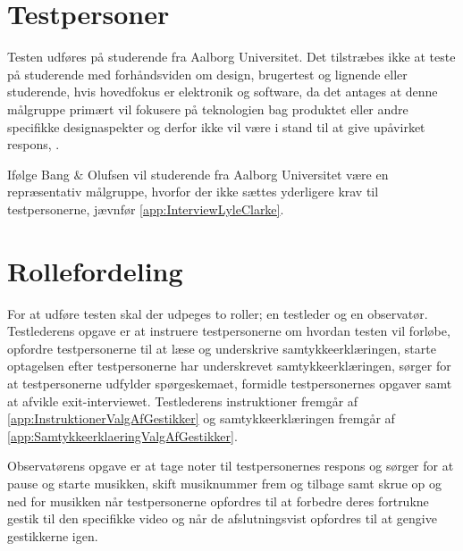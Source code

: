 \section{Testpersoner}
\label{TestpersonerValgAfGestikker}
%
Testen udføres på studerende fra Aalborg Universitet. Det tilstræbes ikke at teste på studerende med forhåndsviden om design, brugertest og lignende eller studerende, hvis hovedfokus er elektronik og software, da det antages at denne målgruppe primært vil fokusere på teknologien bag produktet eller andre specifikke designaspekter og derfor ikke vil være i stand til at give upåvirket respons, \parencite[s. 110]{Book:OUE}. 

Ifølge Bang $\&$ Olufsen vil studerende fra Aalborg Universitet være en repræsentativ målgruppe, hvorfor der ikke sættes yderligere krav til testpersonerne, jævnfør \autoref{app:InterviewLyleClarke}.  
%

\section{Rollefordeling}
\label{RollerfordelingValgAfGestikker}
%
For at udføre testen skal der udpeges to roller; en testleder og en observatør. Testlederens opgave er at instruere testpersonerne om hvordan testen vil forløbe, opfordre testpersonerne til at læse og underskrive samtykkeerklæringen, starte optagelsen efter testpersonerne har underskrevet samtykkeerklæringen, sørger for at testpersonerne udfylder spørgeskemaet, formidle testpersonernes opgaver samt at afvikle exit-interviewet. Testlederens instruktioner fremgår af \autoref{app:InstruktionerValgAfGestikker} og samtykkeerklæringen fremgår af \autoref{app:SamtykkeerklaeringValgAfGestikker}. 

Observatørens opgave er at tage noter til testpersonernes respons og sørger for at pause og starte musikken, skift musiknummer frem og tilbage samt skrue op og ned for musikken når testpersonerne opfordres til at forbedre deres fortrukne gestik til den specifikke video og når de afslutningsvist opfordres til at gengive gestikkerne igen. 

